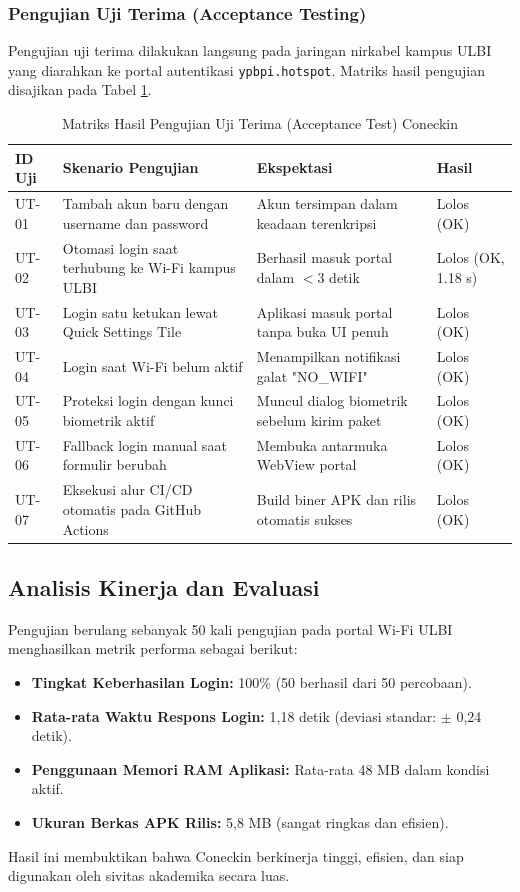 \subsubsection{Pengujian Uji Terima (Acceptance Testing)}
Pengujian uji terima dilakukan langsung pada jaringan nirkabel kampus ULBI yang diarahkan ke portal autentikasi \texttt{ypbpi.hotspot}. Matriks hasil pengujian disajikan pada Tabel \ref{tab:uji_terima}.

\begin{table}[htbp]
\centering
\small
\caption{Matriks Hasil Pengujian Uji Terima (Acceptance Test) Coneckin}
\label{tab:uji_terima}
\begin{tabularx}{\textwidth}{|l|X|l|l|}
\hline
\textbf{ID Uji} & \textbf{Skenario Pengujian} & \textbf{Ekspektasi} & \textbf{Hasil} \\ \hline
UT-01 & Tambah akun baru dengan username dan password & Akun tersimpan dalam keadaan terenkripsi & Lolos (OK) \\ \hline
UT-02 & Otomasi login saat terhubung ke Wi-Fi kampus ULBI & Berhasil masuk portal dalam $<3$ detik & Lolos (OK, 1.18 s) \\ \hline
UT-03 & Login satu ketukan lewat Quick Settings Tile & Aplikasi masuk portal tanpa buka UI penuh & Lolos (OK) \\ \hline
UT-04 & Login saat Wi-Fi belum aktif & Menampilkan notifikasi galat "NO\_WIFI" & Lolos (OK) \\ \hline
UT-05 & Proteksi login dengan kunci biometrik aktif & Muncul dialog biometrik sebelum kirim paket & Lolos (OK) \\ \hline
UT-06 & Fallback login manual saat formulir berubah & Membuka antarmuka WebView portal & Lolos (OK) \\ \hline
UT-07 & Eksekusi alur CI/CD otomatis pada GitHub Actions & Build biner APK dan rilis otomatis sukses & Lolos (OK) \\ \hline
\end{tabularx}
\end{table}

\subsection{Analisis Kinerja dan Evaluasi}
Pengujian berulang sebanyak 50 kali pengujian pada portal Wi-Fi ULBI menghasilkan metrik performa sebagai berikut:
\begin{itemize}
    \item \textbf{Tingkat Keberhasilan Login:} 100\% (50 berhasil dari 50 percobaan).
    \item \textbf{Rata-rata Waktu Respons Login:} 1,18 detik (deviasi standar: $\pm$ 0,24 detik).
    \item \textbf{Penggunaan Memori RAM Aplikasi:} Rata-rata 48 MB dalam kondisi aktif.
    \item \textbf{Ukuran Berkas APK Rilis:} 5,8 MB (sangat ringkas dan efisien).
\end{itemize}
Hasil ini membuktikan bahwa Coneckin berkinerja tinggi, efisien, dan siap digunakan oleh sivitas akademika secara luas.
